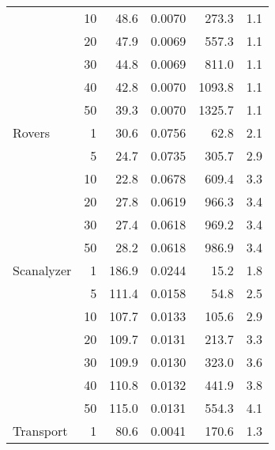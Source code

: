 \begin{table}[!h]
\begin{tabular}{lrrrrr}
         & 10 &        48.6 &      0.0070 &               273.3 &                           1.1 \\
         & 20 &        47.9 &      0.0069 &               557.3 &                           1.1 \\
         & 30 &        44.8 &      0.0069 &               811.0 &                           1.1 \\
         & 40 &        42.8 &      0.0070 &              1093.8 &                           1.1 \\
         & 50 &        39.3 &      0.0070 &              1325.7 &                           1.1 \\ \midrule
Rovers   & 1 &        30.6 &      0.0756 &                62.8 &                           2.1 \\
         & 5 &        24.7 &      0.0735 &               305.7 &                           2.9 \\
         & 10 &        22.8 &      0.0678 &               609.4 &                           3.3 \\
         & 20 &        27.8 &      0.0619 &               966.3 &                           3.4 \\
         & 30 &        27.4 &      0.0618 &               969.2 &                           3.4 \\
         & 50 &        28.2 &      0.0618 &               986.9 &                           3.4 \\ \midrule
Scanalyzer & 1 &       186.9 &      0.0244 &                15.2 &                           1.8 \\
         & 5 &       111.4 &      0.0158 &                54.8 &                           2.5 \\
         & 10 &       107.7 &      0.0133 &               105.6 &                           2.9 \\
         & 20 &       109.7 &      0.0131 &               213.7 &                           3.3 \\
         & 30 &       109.9 &      0.0130 &               323.0 &                           3.6 \\
         & 40 &       110.8 &      0.0132 &               441.9 &                           3.8 \\
         & 50 &       115.0 &      0.0131 &               554.3 &                           4.1 \\ \midrule
Transport & 1 &        80.6 &      0.0041 &               170.6 &                           1.3 \\

\end{tabular}
\end{table}
